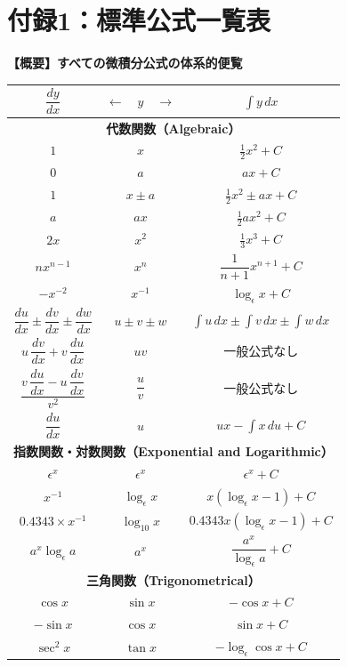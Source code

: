 \documentclass[a4paper,11pt,openany]{ltjsbook}
\begin{document}
\chapter{付録1：標準公式一覧表}
\noindent\textbf{\large 【概要】すべての微積分公式の体系的便覧}\\[4mm]
\begin{center}
\begin{tabular}{|c|c|c|}
\hline
$\dfrac{dy}{dx}$ & $\longleftarrow\quad y\quad\longrightarrow$ & $\displaystyle\int y\, dx$ \\
\hline
\multicolumn{3}{|c|}{\textbf{代数関数（Algebraic）}} \\
\hline
$1$ & $x$ & $\frac{1}{2} x^2 + C$ \\
$0$ & $a$ & $ax + C$ \\
$1$ & $x \pm a$ & $\frac{1}{2} x^2 \pm ax + C$ \\
$a$ & $ax$ & $\frac{1}{2} ax^2 + C$ \\
$2x$ & $x^2$ & $\frac{1}{3} x^3 + C$ \\
$nx^{n-1}$ & $x^n$ & $\dfrac{1}{n+1} x^{n+1} + C$ \\
$-x^{-2}$ & $x^{-1}$ & $\log_\epsilon x + C$ \\
$\dfrac{du}{dx} \pm \dfrac{dv}{dx} \pm \dfrac{dw}{dx}$ & $u \pm v \pm w$ & $\int u\, dx \pm \int v\, dx \pm \int w\, dx$ \\
$u\, \dfrac{dv}{dx} + v\, \dfrac{du}{dx}$ & $uv$ & 一般公式なし \\
$\dfrac{v\, \dfrac{du}{dx} - u\, \dfrac{dv}{dx}}{v^2}$ & $\dfrac{u}{v}$ & 一般公式なし \\
$\dfrac{du}{dx}$ & $u$ & $ux - \int x\, du + C$ \\
\hline
\multicolumn{3}{|c|}{\textbf{指数関数・対数関数（Exponential and Logarithmic）}} \\
\hline
$\epsilon^x$ & $\epsilon^x$ & $\epsilon^x + C$ \\
$x^{-1}$ & $\log_\epsilon x$ & $x(\log_\epsilon x - 1) + C$ \\
$0.4343 \times x^{-1}$ & $\log_{10} x$ & $0.4343x (\log_\epsilon x - 1) + C$ \\
$a^x \log_\epsilon a$ & $a^x$ & $\dfrac{a^x}{\log_\epsilon a} + C$ \\
\hline
\multicolumn{3}{|c|}{\textbf{三角関数（Trigonometrical）}} \\
\hline
$\cos x$ & $\sin x$ & $-\cos x + C$ \\
$-\sin x$ & $\cos x$ & $\sin x + C$ \\
$\sec^2 x$ & $\tan x$ & $-\log_\epsilon \cos x + C$ \\

\end{tabular}
\end{center}
\end{document}
